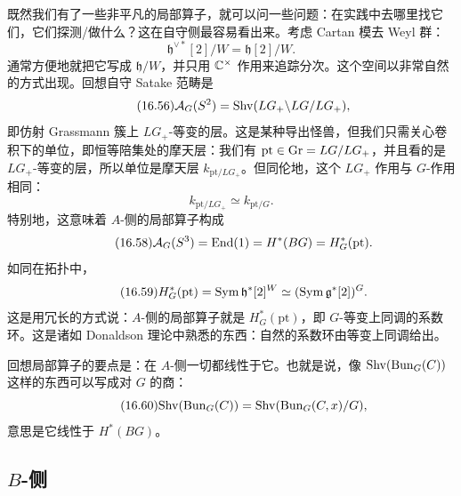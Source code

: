 既然我们有了一些非平凡的局部算子，就可以问一些问题：在实践中去哪里找它们，它们探测/做什么？这在自守侧最容易看出来。考虑 Cartan 模去 Weyl 群：
\begin{equation}\tag{16.55}
\mathfrak{h}^{\vee*}[2]/W=\mathfrak{h}[2]/W.
\end{equation}
通常方便地就把它写成 $\mathfrak{h}/W$，并只用 $\mathbb{C}^\times$ 作用来追踪分次。这个空间以非常自然的方式出现。回想自守 Satake 范畴是
\begin{equation}\tag{16.56}
\mathcal{A}_G(S^2)=\mathrm{Shv}(LG_+\backslash LG/LG_+),
\end{equation}
即仿射 Grassmann 簇上 $LG_+$-等变的层。这是某种导出怪兽，但我们只需关心卷积下的单位，即恒等陪集处的摩天层：我们有 $\mathrm{pt}\in\mathrm{Gr}=LG/LG_+$，并且看的是 $LG_+$-等变的层，所以单位是摩天层 $k_{\mathrm{pt}/LG_+}$。但同伦地，这个 $LG_+$ 作用与 $G$-作用相同：
\begin{equation}\tag{16.57}
k_{\mathrm{pt}/LG_+}\simeq k_{\mathrm{pt}/G}.
\end{equation}
特别地，这意味着 $A$-侧的局部算子构成
\begin{equation}\tag{16.58}
\mathcal{A}_G(S^3)=\mathrm{End}(1)=H^*(BG)=H^*_G(\mathrm{pt}).
\end{equation}
如同在拓扑中，
\begin{equation}\tag{16.59}
H^*_G(\mathrm{pt})=\mathrm{Sym}\,\mathfrak{h}^*[2]^W\simeq(\mathrm{Sym}\,\mathfrak{g}^*[2])^G.
\end{equation}
这是用冗长的方式说：$A$-侧的局部算子就是 $H^*_G(\mathrm{pt})$，即 $G$-等变上同调的系数环。这是诸如 Donaldson 理论中熟悉的东西：自然的系数环由等变上同调给出。

回想局部算子的要点是：在 $A$-侧一切都线性于它。也就是说，像 $\mathrm{Shv}(\mathrm{Bun}_G(C))$ 这样的东西可以写成对 $G$ 的商：
\begin{equation}\tag{16.60}
\mathrm{Shv}(\mathrm{Bun}_G(C))=\mathrm{Shv}(\mathrm{Bun}_G(C,x)/G),
\end{equation}
意思是它线性于 $H^*(BG)$。

\subsection{$B$-侧}

